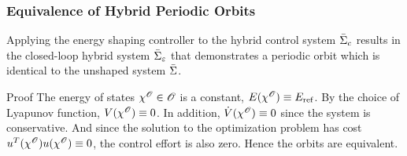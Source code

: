 \begin{frame}[t]
  \frametitle{Equivalence of Hybrid Periodic Orbits}
  \begin{lemma}
    Applying the energy shaping controller to the hybrid control system $\bar{\Sigma}_{c}$
    results in the closed-loop hybrid system $\bar{\Sigma}_{\varepsilon}$ that demonstrates a
    periodic orbit which is identical to the unshaped system $\bar{\Sigma}$.
  \end{lemma}
  \begin{block}{Proof}
    The energy of states $\chi^{\mathscr O} \in \mathscr O$ is a constant,
    $E(\chi^{\mathscr O}) \equiv E_{\mathrm{ref}}$. By the choice of Lyapunov function,
    $V(\chi^{\mathscr O}) \equiv 0$. In addition, ${\dot {V}}(\chi^{\mathscr O}) \equiv 0$ since
    the system is conservative. And since the solution to the optimization
    problem has cost $u^{T}(\chi^{\mathscr O}) u(\chi^{\mathscr O}) \equiv 0$, the
    control effort is also zero. Hence the orbits are equivalent.
  \end{block}
\end{frame}


